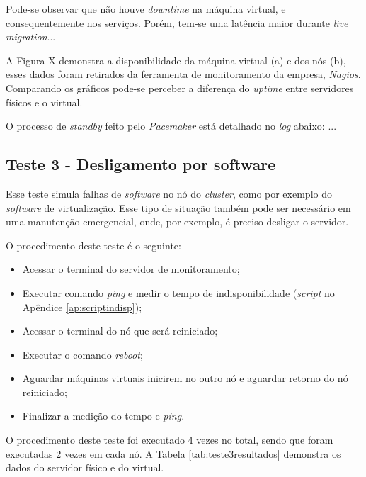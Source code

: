 Pode-se observar que não houve \textit{downtime} na máquina virtual, e consequentemente nos serviços.
Porém, tem-se uma latência maior durante \textit{live migration}...

A Figura X demonstra a disponibilidade da máquina virtual (a) e dos nós (b), esses dados foram retirados da ferramenta de monitoramento da empresa,
\textit{Nagios}. Comparando os gráficos pode-se perceber a diferença do \textit{uptime} entre servidores físicos e o virtual.

O processo de \textit{standby} feito pelo \textit{Pacemaker} está detalhado no \textit{log} abaixo:
...

\subsection{Teste 3 - Desligamento por software}

Esse teste simula falhas de \textit{software} no nó do \textit{cluster}, como por exemplo do \textit{software} de virtualização. Esse tipo de 
situação também pode ser necessário em uma manutenção emergencial, onde, por exemplo, é preciso desligar o servidor.

O procedimento deste teste é o seguinte:
\begin{itemize}
 \item Acessar o terminal do servidor de monitoramento;
 \item Executar comando \textit{ping} e medir o tempo de indisponibilidade (\textit{script} no Apêndice \ref{ap:scriptindisp});
 \item Acessar o terminal do nó que será reiniciado;
 \item Executar o comando \textit{reboot};
 \item Aguardar máquinas virtuais inicirem no outro nó e aguardar retorno do nó reiniciado;
 \item Finalizar a medição do tempo e \textit{ping}.
\end{itemize}

O procedimento deste teste foi executado 4 vezes no total, sendo que foram executadas 2 vezes em cada nó. A Tabela \ref{tab:teste3resultados}
demonstra os dados do servidor físico e do virtual.

